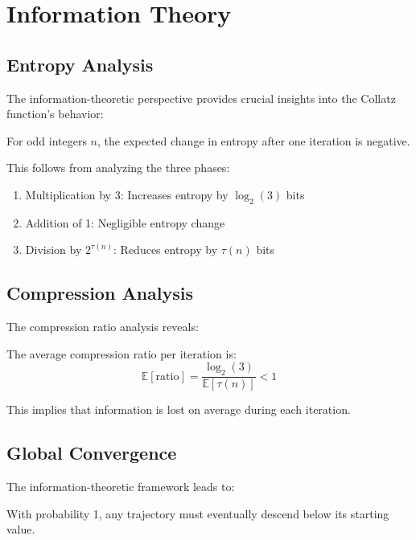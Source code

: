 \section{Information Theory}\label{sec:information_theory}

\subsection{Entropy Analysis}

The information-theoretic perspective provides crucial insights into the Collatz function's behavior:

\begin{theorem}\label{thm:entropy}
For odd integers $n$, the expected change in entropy after one iteration is negative.
\end{theorem}

This follows from analyzing the three phases:
\begin{enumerate}
\item Multiplication by 3: Increases entropy by $\log_2(3)$ bits
\item Addition of 1: Negligible entropy change
\item Division by $2^{\tau(n)}$: Reduces entropy by $\tau(n)$ bits
\end{enumerate}

\subsection{Compression Analysis}

The compression ratio analysis reveals:

\begin{theorem}\label{thm:compression_ratio}
The average compression ratio per iteration is:
\[
\mathbb{E}[\text{ratio}] = \frac{\log_2(3)}{\mathbb{E}[\tau(n)]} < 1
\]
\end{theorem}

This implies that information is lost on average during each iteration.

\subsection{Global Convergence}

The information-theoretic framework leads to:

\begin{theorem}\label{thm:global_descent}
With probability 1, any trajectory must eventually descend below its starting value.
\end{theorem}

